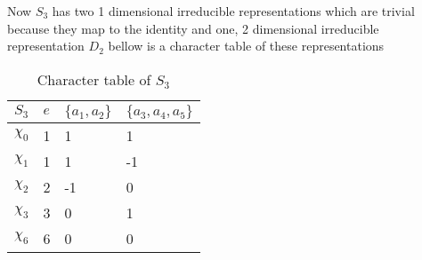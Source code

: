\documentclass[a4paper]{article}
\theoremstyle{definition}
\theoremstyle{definition}
\theoremstyle{definition}
\theoremstyle{theorem}
\theoremstyle{theorem}
\theoremstyle{definition}
\begin{document}
Now $S_3$ has two 1 dimensional irreducible representations which are trivial because they map to the
identity and one, 2 dimensional irreducible representation $D_2$ bellow is a character table of these
representations
\begin{table}[h!]
  \begin{center}
      \caption{Character table of $S_3$}
    \label{tab:table1}
    \begin{tabular}{l|l|l|l}
        $S_3$       & $e$   & $\{a_1, a_2\}$    & $\{a_3, a_4, a_5\}$ \\
      \hline
        $\chi _0$    &  1     &     1              &      1               \\
        \hline
        $\chi _1$    &    1   &     1              &       -1                \\
        \hline
        $\chi _2$    &   2    &     -1              &       0            \\
        \hline
        $\chi _3$    &  3      &       0            &        1       \\
        \hline
        $\chi _6$    &   6    &   0                &    0   \\
    \end{tabular}
  \end{center}
\end{table}
\end{document}
